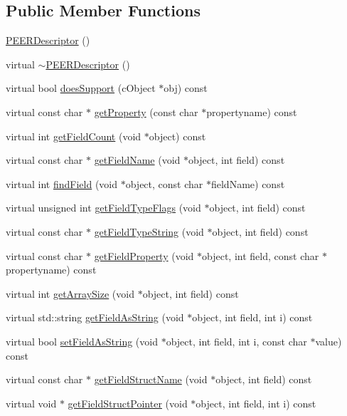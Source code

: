 \subsection*{Public Member Functions}
\begin{DoxyCompactItemize}
\item 
\hyperlink{classPEERDescriptor_ac98eff6a4b6c650837a30fed9c58c898}{P\+E\+E\+R\+Descriptor} ()
\item 
virtual \hyperlink{classPEERDescriptor_abf8331c8a195deb922ae54b79509885a}{$\sim$\+P\+E\+E\+R\+Descriptor} ()
\item 
virtual bool \hyperlink{classPEERDescriptor_a71f8aed4263732caea706370588b5d11}{does\+Support} (c\+Object $\ast$obj) const 
\item 
virtual const char $\ast$ \hyperlink{classPEERDescriptor_a67f9ff91d82dd253b3ff013dfa7eada1}{get\+Property} (const char $\ast$propertyname) const 
\item 
virtual int \hyperlink{classPEERDescriptor_ac805efcb83b73c29bb8f4efde0465fac}{get\+Field\+Count} (void $\ast$object) const 
\item 
virtual const char $\ast$ \hyperlink{classPEERDescriptor_a44eae399e462eb0449bf250965b827c0}{get\+Field\+Name} (void $\ast$object, int field) const 
\item 
virtual int \hyperlink{classPEERDescriptor_af0d287d7ccab253dc32a122aa39d0fcc}{find\+Field} (void $\ast$object, const char $\ast$field\+Name) const 
\item 
virtual unsigned int \hyperlink{classPEERDescriptor_a373bcb2666b13e2f6581f913789b1bf3}{get\+Field\+Type\+Flags} (void $\ast$object, int field) const 
\item 
virtual const char $\ast$ \hyperlink{classPEERDescriptor_a52237786e198ff037c1976468dcfd8e4}{get\+Field\+Type\+String} (void $\ast$object, int field) const 
\item 
virtual const char $\ast$ \hyperlink{classPEERDescriptor_a99156bb4a82bf0553767f0c895e23f3a}{get\+Field\+Property} (void $\ast$object, int field, const char $\ast$propertyname) const 
\item 
virtual int \hyperlink{classPEERDescriptor_a455e1229cc84b23d10e2261e15bce00a}{get\+Array\+Size} (void $\ast$object, int field) const 
\item 
virtual std\+::string \hyperlink{classPEERDescriptor_aeb00ffe24fa93000e3ea61a5d6f38283}{get\+Field\+As\+String} (void $\ast$object, int field, int i) const 
\item 
virtual bool \hyperlink{classPEERDescriptor_a97515c2d476c4100da4716faee598086}{set\+Field\+As\+String} (void $\ast$object, int field, int i, const char $\ast$value) const 
\item 
virtual const char $\ast$ \hyperlink{classPEERDescriptor_a79210a46adb78f48670cb1b42dbbce69}{get\+Field\+Struct\+Name} (void $\ast$object, int field) const 
\item 
virtual void $\ast$ \hyperlink{classPEERDescriptor_a41a4358d8479ca681313acd6fa82ec46}{get\+Field\+Struct\+Pointer} (void $\ast$object, int field, int i) const 
\end{DoxyCompactItemize}


